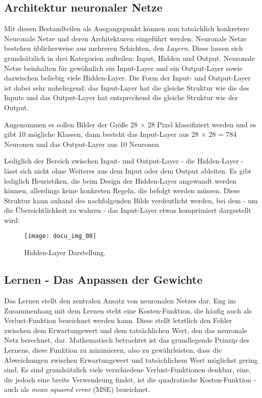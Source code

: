 \subsection{Architektur neuronaler Netze}

Mit diesen Bestandteilen als Ausgangspunkt können nun tatsächlich konkretere Neuronale Netze und deren Architekturen
eingeführt werden. Neuronale Netze bestehen üblicherweise aus mehreren Schichten, den \textit{Layern}. Diese lassen
sich grundsätzlich in drei Kategorien aufteilen: Input, Hidden und Output. Neuronale Netze beinhalten für gewöhnlich
ein Input-Layer und ein Output-Layer sowie dazwischen beliebig viele Hidden-Layer. Die Form der Input- und Output-Layer
ist dabei sehr naheliegend: das Input-Layer hat die gleiche Struktur wie die des Inputs und das Output-Layer hat
entsprechend die gleiche Struktur wie der Output.

Angenommen es sollen Bilder der Größe 28 \(\times\) 28 Pixel klassifiziert werden und es gibt 10 mögliche Klassen, dann besteht das
Input-Layer aus 28 \(\times\) 28 = 784 Neuronen und das Output-Layer aus 10 Neuronen.

Lediglich der Bereich zwischen Input- und Output-Layer - die Hidden-Layer - lässt sich nicht ohne Weiteres aus dem Input
oder dem Output ableiten. Es gibt lediglich Heuristiken, die beim Design der Hidden-Layer angewandt werden können,
allerdings keine konkreten Regeln, die befolgt werden müssen. Diese Struktur kann anhand des nachfolgenden Bilds
verdeutlicht werden, bei dem - um die Übersichtlichkeit zu wahren - das Input-Layer etwas komprimiert dargestellt wird:

\begin{figure}[h]
    \centering
    \texttt{[image: docu\_img\_08]}
    \caption{Hidden-Layer Darstellung.}
    \label{fig:hidden-layers}
\end{figure}

\subsection{Lernen - Das Anpassen der Gewichte}

Das Lernen stellt den zentralen Ansatz von neuronalen Netzes dar. Eng im Zusammenhang mit dem Lernen steht eine
Kosten-Funktion, die häufig auch als Verlust-Funktion bezeichnet werden kann. Diese stellt letztlich den Fehler zwischen
dem Erwartungswert und dem tatsächlichen Wert, den das neuronale Netz berechnet, dar. Mathematisch betrachtet ist das
grundlegende Prinzip des Lernens, diese Funktion zu minimieren, also zu gewährleisten, dass die Abweichungen zwischen
Erwartungswert und tatsächlichem Wert möglichst gering sind. Es sind grundsätzlich viele verschiedene Verlust-Funktionen
denkbar, eine, die jedoch eine breite Verwendeung findet, ist die quadratische Kosten-Funktion - auch als \textit{mean squared
error} (MSE) bezeichnet.

